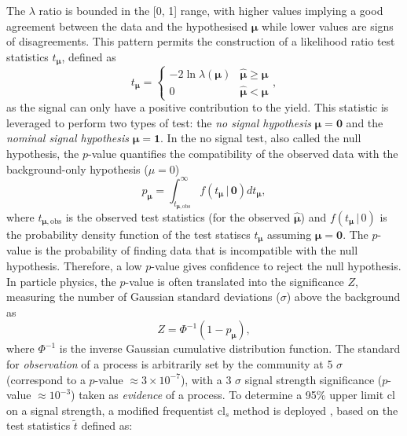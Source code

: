 The $\lambda$ ratio is bounded in the  [0, 1] range, with higher values implying a good agreement between the data and the hypothesised $\boldsymbol{\mu}$ while lower values are signs of disagreements. This pattern permits the construction of a likelihood ratio test statistics $t_{\boldsymbol{\mu}}$, defined as \cite{asympForm}
\begin{equation}\label{eq-lik-ratio-test}
    t_{\boldsymbol{\mu}} =
      \begin{cases}
        -2 \ln \lambda(\boldsymbol{\mu}) & \hat{\boldsymbol{\mu}} \geq \boldsymbol{\mu} \\
        0 & \hat{\boldsymbol{\mu}} < \boldsymbol{\mu}
      \end{cases},
\end{equation}
as the signal can only have a positive contribution to the yield. This statistic is leveraged to perform two types of test: the \textit{no signal hypothesis} $\boldsymbol{\mu} = \boldsymbol{0}$ and the \textit{nominal signal hypothesis} $\boldsymbol{\mu} = \boldsymbol{1}$. In the no signal test, also called the null hypothesis, the $p$-value quantifies the compatibility of the observed data with the background-only hypothesis ($\mu = 0$)
\begin{equation}
    p_{\boldsymbol{\mu}}=\int_{t_{\boldsymbol{\mu},\mathrm{obs}}}^{\infty} f(t_{\boldsymbol{\mu}} \,| \, \boldsymbol{0}) dt_{\boldsymbol{\mu}},
\end{equation}
where $t_{\boldsymbol{\mu},\mathrm{obs}}$ is the observed test statistics (for the observed $\hat{\boldsymbol{\mu}}$) and $f(t_{\boldsymbol{\mu}} \,| \,0)$ is the probability density function of the test statiscs $t_{\boldsymbol{\mu}}$ assuming $\boldsymbol{\mu} = \boldsymbol{0}$. The $p$-value is the probability of finding data that is incompatible with the null hypothesis. Therefore, a low $p$-value gives confidence to reject the null hypothesis. In particle physics, the $p$-value is often translated into the significance $Z$, measuring the number of Gaussian standard deviations ($\sigma$) above the background as
\begin{equation}
    Z = \Phi^{-1}(1-p_{\boldsymbol{\mu}}),
\end{equation}
where $\Phi^{-1}$ is the inverse Gaussian cumulative distribution function. The standard for \textit{observation} of a process is arbitrarily set by the community at 5 $\sigma$ (correspond to a $p$-value $\approx 3 \times 10^{-7}$), with a 3 $\sigma$ signal strength significance ($p$-value $\approx 10^{-3}$) taken as \textit{evidence} of a process. To determine a 95\% upper limit \gls{cl} on a signal strength, a modified frequentist \gls{cl}$_s$ method is deployed \cite{asympForm, ALRead_2002}, based on the test statistics $\tilde{t}$ defined as:
